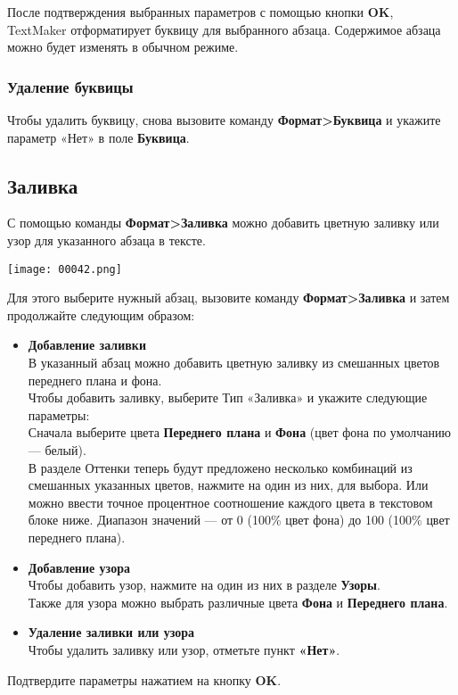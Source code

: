 ﻿\documentclass[a4paper,10pt]{article}
\begin{document}
После подтверждения выбранных параметров с помощью кнопки \textbf{OK}, TextMaker отформатирует буквицу для выбранного абзаца. Содержимое абзаца можно будет изменять в обычном режиме.

\subsubsection{Удаление буквицы}
Чтобы удалить буквицу, снова вызовите команду \textbf{Формат>Буквица} и укажите параметр «Нет» в поле \textbf{Буквица}. 

\subsection{Заливка} \label{sec:заливка}
С помощью команды \textbf{Формат>Заливка} можно добавить цветную заливку или узор для указанного абзаца в тексте.

\texttt{[image: 00042.png]}

Для этого выберите нужный абзац, вызовите команду \textbf{Формат>Заливка} и затем продолжайте следующим образом:
\begin{itemize}
 \item \textbf{Добавление заливки}\\
 В указанный абзац можно добавить цветную заливку из смешанных цветов переднего плана и фона.\\
 Чтобы добавить заливку, выберите Тип «Заливка» и укажите следующие параметры:\\
Сначала выберите цвета \textbf{Переднего плана} и \textbf{Фона} (цвет фона по умолчанию — белый).\\
В разделе Оттенки теперь будут предложено несколько комбинаций из смешанных указанных цветов, нажмите на один из них, для выбора. Или можно ввести точное процентное соотношение каждого цвета в текстовом блоке ниже. Диапазон значений — от 0 (100\% цвет фона) до 100 (100\% цвет переднего плана).
\item \textbf{Добавление узора}\\
Чтобы добавить узор, нажмите на один из них в разделе \textbf{Узоры}.\\
Также для узора можно выбрать различные цвета \textbf{Фона} и \textbf{Переднего плана}.
\item \textbf{Удаление заливки или узора}\\
Чтобы удалить заливку или узор, отметьте пункт \textbf{«Нет»}. 
\end{itemize}

Подтвердите параметры нажатием на кнопку \textbf{OK}.
\end{document}
